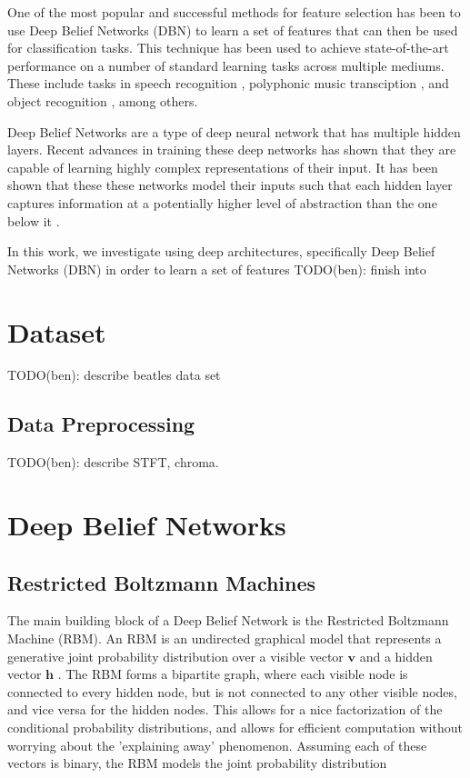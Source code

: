 \documentclass{article}
\begin{document}
One of the most popular and successful methods for feature selection has been
to use Deep Belief Networks (DBN) to learn a set of features that can then
be used for classification tasks. This technique has been used to achieve
state-of-the-art performance on a number of standard learning tasks across
multiple mediums. These include tasks in speech recognition 
\cite{Mohamed_acousticmodeling, dahl2010phone}, polyphonic music transciption
\cite{boulanger2012modeling}, and object recognition 
\cite{krizhevsky2012imagenet, ciresan2012multi, rifai2011manifold}, among
others.

Deep Belief Networks are a type of deep neural network that has multiple hidden
layers. Recent advances in training these deep networks has shown that they are
capable of learning highly complex representations of their input. It has been
shown that these these networks model their inputs such that each hidden layer
captures information at a potentially higher level of abstraction than the one
below it \cite{Bengio_learning}. 

In this work, we investigate using deep architectures, specifically
Deep Belief Networks (DBN) in order to learn a set of features 
TODO(ben): finish into

\section{Dataset} 
TODO(ben): describe beatles data set

\subsection{Data Preprocessing}
TODO(ben): describe STFT, chroma. 

\section{Deep Belief Networks}

\subsection{Restricted Boltzmann Machines}

The main building block of a Deep Belief Network is the Restricted Boltzmann
Machine (RBM). An RBM is an undirected graphical model that represents a
generative joint probability distribution over a visible vector $\mathbf{v}$
and a hidden vector $\mathbf{h}$ \cite{mnih2012conditional}. The RBM forms a
bipartite graph, where each visible node is connected to every hidden node, but
is not connected to any other visible nodes, and vice versa for the hidden
nodes.  This allows for a nice factorization of the conditional probability
distributions, and allows for efficient computation without worrying about the
'explaining away' phenomenon. Assuming each of these vectors is binary,
the RBM models the joint probability distribution
\end{document}
